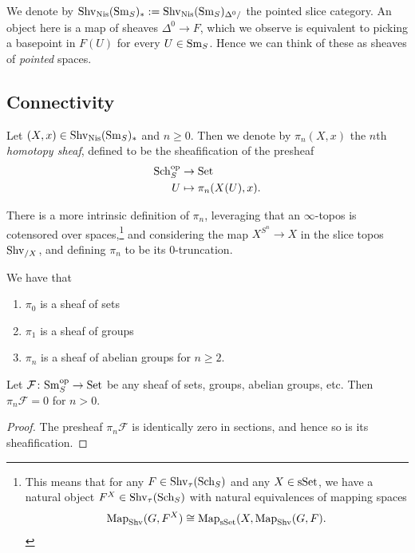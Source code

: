 \documentclass[11pt]{amsart}
\begin{document}
\begin{notation} We denote by $\mathrm{Shv}_{\mathrm{Nis}}(\mathrm{Sm}_S)_\ast := \mathrm{Shv}_{\mathrm{Nis}}(\mathrm{Sm}_S)_{\Delta^0/}$ the pointed slice category. An object here is a map of sheaves $\Delta^0 \to F$, which we observe is equivalent to picking a basepoint in $F(U)$ for every $U \in \mathrm{Sm}_S$. Hence we can think of these as sheaves of \textit{pointed} spaces.
\end{notation}

\subsection{Connectivity}



\begin{definition} Let $(X,x)\in\mathrm{Shv}_{\mathrm{Nis}}(\mathrm{Sm}_S)_\ast$ and $n\ge0$. Then we denote by $\pi_n(X,x)$ the $n$th \textit{homotopy sheaf}, defined to be the sheafification of the presheaf
\begin{align*}
    \mathrm{Sch}_S^{\mathrm{op}} &\to \mathrm{Set} \\
    U &\mapsto \pi_n(X(U),x).
\end{align*}
\end{definition}

\begin{remark} There is a more intrinsic definition of $\pi_n$, leveraging that an $\infty$-topos is cotensored over spaces,\footnote{%
This means that for any $F \in \mathrm{Shv}_\tau(\mathrm{Sch}_S)$ and any $X \in \mathrm{sSet}$, we have a natural object $F^X\in \mathrm{Shv}_\tau(\mathrm{Sch}_S)$ with natural equivalences of mapping spaces
\begin{align*}
    \mathrm{Map}_{\mathrm{Shv}}(G,F^X) \cong \mathrm{Map}_{\mathrm{sSet}}(X,\mathrm{Map}_{\mathrm{Shv}}(G,F).
\end{align*}
}
and considering the map $X^{S^n} \to X$ in the slice topos $\mathrm{Shv}_{/X}$, and defining $\pi_n$ to be its 0-truncation.
\end{remark}


\begin{proposition} We have that
\begin{enumerate}
    \item $\pi_0$ is a sheaf of sets
    \item $\pi_1$ is a sheaf of groups
    \item $\pi_n$ is a sheaf of abelian groups for $n\ge 2$.
\end{enumerate}
\end{proposition}

\begin{example} Let $\mathcal{F} \colon \mathrm{Sm}_S^{\mathrm{op}} \to \mathrm{Set}$ be any sheaf of sets, groups, abelian groups, etc. Then $\pi_n \mathcal{F} = 0$ for $n>0$.
\end{example}
\begin{proof} The presheaf $\pi_n \mathcal{F}$ is identically zero in sections, and hence so is its sheafification.
\end{proof}
\end{document}
